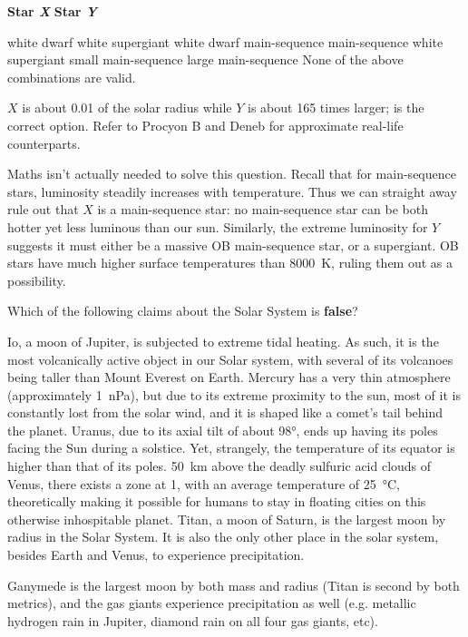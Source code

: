 \documentclass[a4paper,11pt]{exam}
\begin{document}
\begin{questions}
	\hspace{21pt} \textbf{Star \textit{X}} \tabto{6.3cm} \textbf{Star \textit{Y}}
	\begin{choices}
		\correctchoice white dwarf         \tabto{5.5cm} white supergiant
		\choice white dwarf         \tabto{5.5cm} main-sequence
		\choice main-sequence       \tabto{5.5cm} white supergiant
		\choice small main-sequence \tabto{5.5cm} large main-sequence
		\choice None of the above combinations are valid.
	\end{choices}
	\begin{solution}
		$ X $ is about 0.01 of the solar radius while $ Y $ is about 165 times larger;  is the correct option. Refer to Procyon B and Deneb for approximate real-life counterparts.

		Maths isn’t actually needed to solve this question. Recall that for main-sequence stars, luminosity steadily increases with temperature. Thus we can straight away rule out that $ X $ is a main-sequence star: no main-sequence star can be both hotter yet less luminous than our sun. Similarly, the extreme luminosity for $ Y $ suggests it must either be a massive OB main-sequence star, or a supergiant. OB stars have much higher surface temperatures than \SI{8000}{\K}, ruling them out as a possibility.
	\end{solution}

\filbreak
\question
	Which of the following claims about the Solar System is \textbf{false}?
	\begin{choices}
		\choice Io, a moon of Jupiter, is subjected to extreme tidal heating. As such, it is the most volcanically active object in our Solar system, with several of its volcanoes being taller than Mount Everest on Earth.
		\choice Mercury has a very thin atmosphere (approximately \SI{1}{\nano\pascal}), but due to its extreme proximity to the sun, most of it is constantly lost from the solar wind, and it is shaped like a comet’s tail behind the planet.
		\choice Uranus, due to its axial tilt of about \ang{98}, ends up having its poles facing the Sun during a solstice. Yet, strangely, the temperature of its equator is higher than that of its poles.
		\choice \SI{50}{\km} above the deadly sulfuric acid clouds of Venus, there exists a zone at \SI{1}{\atm}, with an average temperature of \SI{25}{\degreeCelsius}, theoretically making it possible for humans to stay in floating cities on this otherwise inhospitable planet.
		\correctchoice Titan, a moon of Saturn, is the largest moon by radius in the Solar System. It is also the only other place in the solar system, besides Earth and Venus, to experience precipitation.
	\end{choices}
	\begin{solution}
		Ganymede is the largest moon by both mass and radius (Titan is second by both metrics), and the gas giants experience precipitation as well (e.g. metallic hydrogen rain in Jupiter, diamond rain on all four gas giants, etc).
	\end{solution}


\end{questions}
\end{document}
